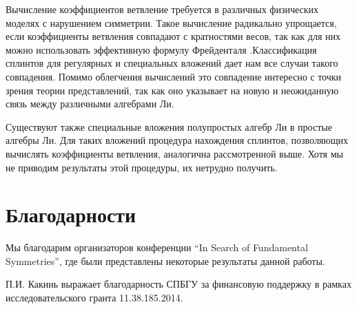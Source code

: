 \documentclass[12pt]{article}
\begin{document}
Вычисление коэффициентов ветвление требуется в различных физических моделях с нарушением симметрии.
Такое вычисление радикально упрощается, если коэффициенты ветвления совпадают с кратностями весов,
так как для них можно использовать эффективную формулу Фрейденталя
\cite{moody1982fast}.Классификация сплинтов для регулярных и специальных вложений дает нам все
случаи такого совпадения. Помимо облегчения вычислений это совпадение интересно с точки зрения
теории представлений, так как оно указывает на новую и неожиданную связь между различными алгебрами
Ли.

Существуют также специальные вложения полупростых алгебр Ли в простые алгебры Ли. Для таких вложений
процедура нахождения сплинтов, позволяющих вычислять коэффициенты ветвления, аналогична
рассмотренной выше. Хотя мы не приводим результаты этой процедуры, их нетрудно получить.

\section*{Благодарности}
\label{sec:acknowledgements}

Мы благодарим организаторов конференции ``In Search of Fundamental Symmetries'', где были
представлены некоторые результаты данной работы. 

П.И. Какинь выражает благодарность СПБГУ за финансовую поддержку в рамках исследовательского гранта  11.38.185.2014.

{} 

\end{document}
